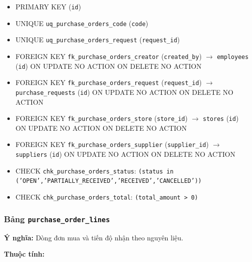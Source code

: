 \begin{itemize}

\item PRIMARY KEY (\texttt{id})

\item UNIQUE \texttt{uq\_purchase\_orders\_code} (\texttt{code})

\item UNIQUE \texttt{uq\_purchase\_orders\_request} (\texttt{request\_id})

\item FOREIGN KEY \texttt{fk\_purchase\_orders\_creator} (\texttt{created\_by}) $\rightarrow$ \texttt{employees} (\texttt{id}) ON UPDATE NO ACTION ON DELETE NO ACTION

\item FOREIGN KEY \texttt{fk\_purchase\_orders\_request} (\texttt{request\_id}) $\rightarrow$ \texttt{purchase\_requests} (\texttt{id}) ON UPDATE NO ACTION ON DELETE NO ACTION

\item FOREIGN KEY \texttt{fk\_purchase\_orders\_store} (\texttt{store\_id}) $\rightarrow$ \texttt{stores} (\texttt{id}) ON UPDATE NO ACTION ON DELETE NO ACTION

\item FOREIGN KEY \texttt{fk\_purchase\_orders\_supplier} (\texttt{supplier\_id}) $\rightarrow$ \texttt{suppliers} (\texttt{id}) ON UPDATE NO ACTION ON DELETE NO ACTION

\item CHECK \texttt{chk\_purchase\_orders\_status}: \texttt{(status in ('OPEN','PARTIALLY\_RECEIVED','RECEIVED','CANCELLED'))}

\item CHECK \texttt{chk\_purchase\_orders\_total}: \texttt{(total\_amount > 0)}

\end{itemize}

\subsubsection{Bảng \texttt{purchase\_order\_lines}}

\textbf{Ý nghĩa:} Dòng đơn mua và tiến độ nhận theo nguyên liệu.\par

\textbf{Thuộc tính:}

